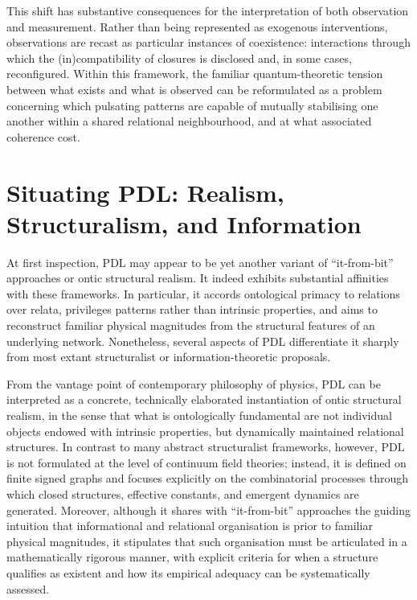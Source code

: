 \documentclass{article}
\theoremstyle{definition}
\newcommand{\PDL}{\ensuremath{\mathrm{PDL}}}
\begin{document}
This shift has substantive consequences for the interpretation of both observation and measurement.  
Rather than being represented as exogenous interventions, observations are recast as particular instances of coexistence: interactions through which the (in)compatibility of closures is disclosed and, in some cases, reconfigured.%
\cite{PDL_Topological_2026,PDL_Global_Mapping_2026_v3}
Within this framework, the familiar quantum-theoretic tension between what exists and what is observed can be reformulated as a problem concerning which pulsating patterns are capable of mutually stabilising one another within a shared relational neighbourhood, and at what associated coherence cost.

\section{Situating PDL: Realism, Structuralism, and Information}
\label{sec:positioning}

At first inspection, \PDL{} may appear to be yet another variant of “it-from-bit” approaches or ontic structural realism. It indeed exhibits substantial affinities with these frameworks. In particular, it accords ontological primacy to relations over relata, privileges patterns rather than intrinsic properties, and aims to reconstruct familiar physical magnitudes from the structural features of an underlying network.%
\cite{PDL_Main_2026,PDL_Global_Mapping_2026_v3}
Nonetheless, several aspects of \PDL{} differentiate it sharply from most extant structuralist or information-theoretic proposals.

From the vantage point of contemporary philosophy of physics, \PDL{} can be interpreted as a concrete, technically elaborated instantiation of ontic structural realism, in the sense that what is ontologically fundamental are not individual objects endowed with intrinsic properties, but dynamically maintained relational structures.%
In contrast to many abstract structuralist frameworks, however, \PDL{} is not formulated at the level of continuum field theories; instead, it is defined on finite signed graphs and focuses explicitly on the combinatorial processes through which closed structures, effective constants, and emergent dynamics are generated.%
\cite{PDL_Main_2026,PDL_Minimal_Closures_2026}
Moreover, although it shares with “it-from-bit” approaches the guiding intuition that informational and relational organisation is prior to familiar physical magnitudes, it stipulates that such organisation must be articulated in a mathematically rigorous manner, with explicit criteria for when a structure qualifies as existent and how its empirical adequacy can be systematically assessed.%
\cite{PDL_Position_2026,PDL_Global_Mapping_2026_v3}
\end{document}
